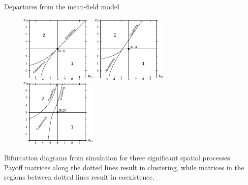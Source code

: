 \documentclass{beamer}
\begin{document}
\begin{frame}{Departures from the mean-field model}
  \begin{figure}
    \includegraphics[width=0.33\textwidth]{./images/group_1_bifurcation_diagram.eps}
    \includegraphics[width=0.33\textwidth]{./images/group_2_bifurcation_diagram.eps}
    \includegraphics[width=0.33\textwidth]{./images/group_3_bifurcation_diagram.eps}
  \end{figure}
\begin{block}{}
  \small{Bifurcation diagrams from simulation for three significant spatial processes. Payoff matrices along the dotted lines result in clustering, while matrices in the regions between dotted lines result in coexistence.}
\end{block}
\end{frame}
\end{document}
